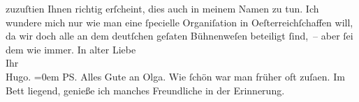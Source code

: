 \begin{ledgroupsized}[t]{13cm}
                        zuzuſti{\geminationm}en Ihnen richtig erſcheint, dies auch
                    in meinem Namen zu tun.\pend
           \pstart
           Ich wundere mich nur wie man eine ſpecielle Organiſation in Oeſterreichſchaffen will, da wir doch alle an dem
                    deutſchen geſa{\geminationm}ten Bühnenweſen beteiligt ſind, –
                    aber ſei dem wie immer.\pend
           \pstart
           In alter Liebe{\\[\baselineskip]}Ihr{\\[\baselineskip]}\spacefill\mbox{Hugo.}\pend
           \leftskip=0em{}\pstart
           \noindent{}\textsc{PS}. Alles Gute an Olga. Wie ſchön war man früher oft zuſa{\geminationm}en. Im Bett liegend, genieße ich manches
                        Freundliche in der Erinnerung.\pend
           
         
         \endnumbering{}\end{ledgroupsized}  \newcommand{\dateiname}{L02323}\newcommand{\titel}{Hugo Hofmannsthal an Arthur Schnitzler, 20. 4. 1919}\newcommand{\editorInnen}{Martin Anton Müller und Gerd-Hermann Susen}
      